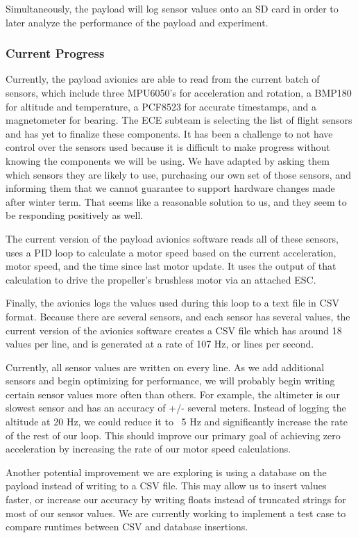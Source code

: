\documentclass[onecolumn, draftclsnofoot, 10pt, compsoc]{IEEEtran}
\begin{document}
Simultaneously, the payload will log sensor values onto an SD card in order to later analyze the performance of the payload and experiment.

\subsubsection{Current Progress}
Currently, the payload avionics are able to read from the current batch of sensors, which include three MPU6050's for acceleration and rotation, a BMP180 for altitude and temperature, a PCF8523 for accurate timestamps, and a magnetometer for bearing.  The ECE subteam is selecting the list of flight sensors and has yet to finalize these components.  It has been a challenge to not have control over the sensors used because it is difficult to make progress without knowing the components we will be using.  We have adapted by asking them which sensors they are likely to use, purchasing our own set of those sensors, and informing them that we cannot guarantee to support hardware changes made after winter term.  That seems like a reasonable solution to us, and they seem to be responding positively as well.

The current version of the payload avionics software reads all of these sensors, uses a PID loop to calculate a motor speed based on the current acceleration, motor speed, and the time since last motor update.  It uses the output of that calculation to drive the propeller's brushless motor via an attached ESC.

Finally, the avionics logs the values used during this loop to a text file in CSV format.  Because there are several sensors, and each sensor has several values, the current version of the avionics software creates a CSV file which has around 18 values per line, and is generated at a rate of 107 Hz, or lines per second.

Currently, all sensor values are written on every line.  As we add additional sensors and begin optimizing for performance, we will probably begin writing certain sensor values more often than others.  For example, the altimeter is our slowest sensor and has an accuracy of +/- several meters.  Instead of logging the altitude at 20 Hz, we could reduce it to ~5 Hz and significantly increase the rate of the rest of our loop.  This should improve our primary goal of achieving zero acceleration by increasing the rate of our motor speed calculations.

Another potential improvement we are exploring is using a database on the payload instead of writing to a CSV file.  This may allow us to insert values faster, or increase our accuracy by writing floats instead of truncated strings for most of our sensor values.  We are currently working to implement a test case to compare runtimes between CSV and database insertions.
\end{document}
